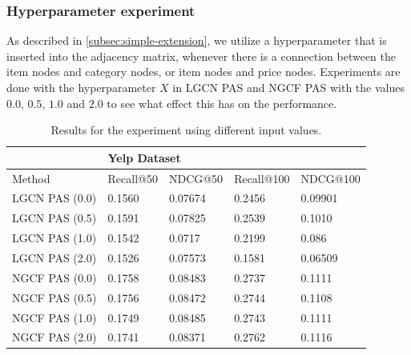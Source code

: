 \subsubsection{Hyperparameter experiment}
As described in \autoref{subsec:simple-extension}, we utilize a hyperparameter that is inserted into the adjacency matrix, whenever there is a connection between the item nodes and category nodes, or item nodes and price nodes.
Experiments are done with the hyperparameter $X$ in LGCN PAS and NGCF PAS with the values $0.0$, $0.5$, $1.0$ and $2.0$ to see what effect this has on the performance.
\begin{table}[h!]
    \centering
    \begin{tabular}{|l|l|l|l|l|}
        \hline
        \rowcolor[HTML]{FFFFFF}
                       & \multicolumn{4}{l|}{\cellcolor[HTML]{FFFFFF}Yelp Dataset}                                   \\ \hline
        Method         & Recall@50                                                 & NDCG@50 & Recall@100 & NDCG@100 \\ \hline
        LGCN PAS (0.0) & 0.1560                                                    & 0.07674 & 0.2456     & 0.09901  \\ \hline
        LGCN PAS (0.5) & 0.1591                                                    & 0.07825 & 0.2539     & 0.1010   \\ \hline
        LGCN PAS (1.0) & 0.1542                                                    & 0.0717  & 0.2199     & 0.086    \\ \hline
        LGCN PAS (2.0) & 0.1526                                                    & 0.07573 & 0.1581     & 0.06509  \\ \hline
        NGCF PAS (0.0) & 0.1758                                                    & 0.08483 & 0.2737     & 0.1111   \\ \hline
        NGCF PAS (0.5) & 0.1756                                                    & 0.08472 & 0.2744     & 0.1108   \\ \hline
        NGCF PAS (1.0) & 0.1749                                                    & 0.08485 & 0.2743     & 0.1111   \\ \hline
        NGCF PAS (2.0) & 0.1741                                                    & 0.08371 & 0.2762     & 0.1116   \\ \hline
    \end{tabular}
    \caption{Results for the experiment using different input values.}
    \label{tab:hyperparameter-results}
\end{table}
